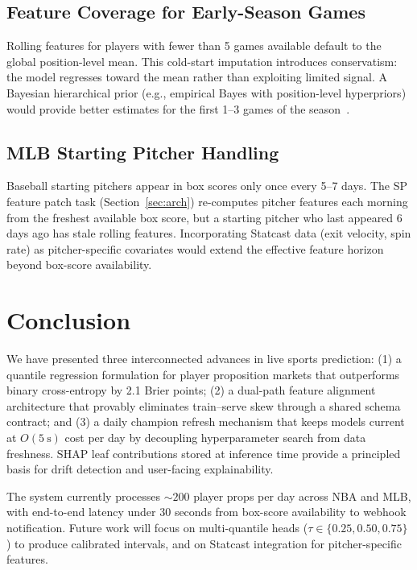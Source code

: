\documentclass[conference]{IEEEtran}
\begin{document}
\subsection{Feature Coverage for Early-Season Games}

Rolling features for players with fewer than 5 games available
default to the global position-level mean.  This cold-start
imputation introduces conservatism: the model regresses toward
the mean rather than exploiting limited signal.  A Bayesian
hierarchical prior (e.g., empirical Bayes with position-level
hyperpriors) would provide better estimates for the first 1--3
games of the season~\cite{efron2012}.

\subsection{MLB Starting Pitcher Handling}

Baseball starting pitchers appear in box scores only once every
5--7 days.  The SP feature patch task (Section~\ref{sec:arch})
re-computes pitcher features each morning from the freshest
available box score, but a starting pitcher who last appeared
6 days ago has stale rolling features.  Incorporating Statcast
data (exit velocity, spin rate) as pitcher-specific covariates
would extend the effective feature horizon beyond box-score availability.

\section{Conclusion}
\label{sec:conclusion}

We have presented three interconnected advances in live sports
prediction: (1) a quantile regression formulation for player
proposition markets that outperforms binary cross-entropy by 2.1
Brier points; (2) a dual-path feature alignment architecture that
provably eliminates train--serve skew through a shared schema
contract; and (3) a daily champion refresh mechanism that keeps
models current at $O(5~\text{s})$ cost per day by decoupling
hyperparameter search from data freshness.  SHAP leaf contributions
stored at inference time provide a principled basis for drift
detection and user-facing explainability.

The system currently processes $\sim\!200$ player props per day
across NBA and MLB, with end-to-end latency under 30 seconds from
box-score availability to webhook notification.  Future work will
focus on multi-quantile heads ($\tau \in \{0.25, 0.50, 0.75\}$)
to produce calibrated intervals, and on Statcast integration for
pitcher-specific features.
\end{document}
